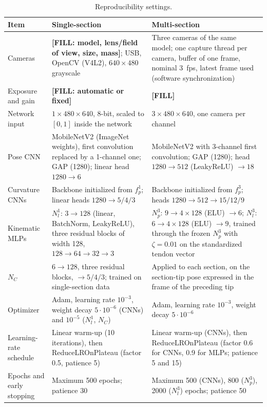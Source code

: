 \begin{table}[h]
\centering
\footnotesize
\caption{Reproducibility settings.}
\label{tab:S11_repro}
\begin{tabular}{>{\raggedright\arraybackslash}p{2.8cm} >{\raggedright\arraybackslash}p{6.2cm} >{\raggedright\arraybackslash}p{6.2cm}}
\toprule
Item & Single-section & Multi-section \\
\midrule
Cameras & \textbf{[FILL: model, lens/field of view, size, mass]}; USB, OpenCV (V4L2), $640 \times 480$ grayscale & Three cameras of the same model; one capture thread per camera, buffer of one frame, nominal 3~fps, latest frame used (software synchronization) \\
Exposure and gain & \textbf{[FILL: automatic or fixed]} & \textbf{[FILL]} \\
Network input & $1 \times 480 \times 640$, 8-bit, scaled to $[0, 1]$ inside the network & $3 \times 480 \times 640$, one camera per channel \\
Pose CNN & MobileNetV2 (ImageNet weights), first convolution replaced by a 1-channel one; GAP (1280); linear head $1280 \to 6$ & MobileNetV2 with 3-channel first convolution; GAP (1280); head $1280 \to 512$ (LeakyReLU) $\to 18$ \\
Curvature CNNs & Backbone initialized from $f_p^1$; linear heads $1280 \to 5 / 4 / 3$ & Backbone initialized from $f_p^3$; heads $1280 \to 512 \to 15 / 12 / 9$ \\
Kinematic MLPs & $N_l^1$: $3 \to 128$ (linear, BatchNorm, LeakyReLU), three residual blocks of width 128, $128 \to 64 \to 32 \to 3$ & $N_p^3$: $9 \to 4 \times 128$ (ELU) $\to 6$; $N_l^3$: $6 \to 4 \times 128$ (ELU) $\to 9$, trained through the frozen $N_p^3$ with $\zeta = 0.01$ on the standardized tendon vector \\
$N_C$ & $6 \to 128$, three residual blocks, $\to 5 / 4 / 3$; trained on single-section data & Applied to each section, on the section-tip pose expressed in the frame of the preceding tip \\
Optimizer & Adam, learning rate $10^{-3}$, weight decay $5 \cdot 10^{-6}$ (CNNs) and $10^{-5}$ ($N_l^1$, $N_C$) & Adam, learning rate $10^{-3}$, weight decay $5 \cdot 10^{-6}$ \\
Learning-rate schedule & Linear warm-up (10 iterations), then ReduceLROnPlateau (factor 0.5, patience 5) & Linear warm-up (CNNs), then ReduceLROnPlateau (factor 0.6 for CNNs, 0.9 for MLPs; patience 5 and 15) \\
Epochs and early stopping & Maximum 500 epochs; patience 30 & Maximum 500 (CNNs), 800 ($N_p^3$), 2000 ($N_l^3$) epochs; patience 50 \\

\end{tabular}
\end{table}
